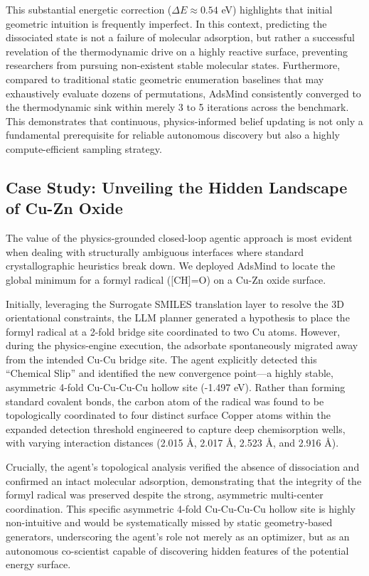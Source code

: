 \documentclass{article}
\begin{document}
This substantial energetic correction ($\Delta E \approx 0.54$ eV) highlights that initial geometric intuition is frequently imperfect. In this context, predicting the dissociated state is not a failure of molecular adsorption, but rather a successful revelation of the thermodynamic drive on a highly reactive surface, preventing researchers from pursuing non-existent stable molecular states. Furthermore, compared to traditional static geometric enumeration baselines that may exhaustively evaluate dozens of permutations, AdsMind consistently converged to the thermodynamic sink within merely 3 to 5 iterations across the benchmark. This demonstrates that continuous, physics-informed belief updating is not only a fundamental prerequisite for reliable autonomous discovery but also a highly compute-efficient sampling strategy.

\subsection{Case Study: Unveiling the Hidden Landscape of Cu-Zn Oxide}
The value of the physics-grounded closed-loop agentic approach is most evident when dealing with structurally ambiguous interfaces where standard crystallographic heuristics break down. We deployed AdsMind to locate the global minimum for a formyl radical ($\text{[CH]=O}$) on a Cu-Zn oxide surface.

Initially, leveraging the Surrogate SMILES translation layer to resolve the 3D orientational constraints, the LLM planner generated a hypothesis to place the formyl radical at a 2-fold bridge site coordinated to two Cu atoms. However, during the physics-engine execution, the adsorbate spontaneously migrated away from the intended Cu-Cu bridge site. The agent explicitly detected this ``Chemical Slip'' and identified the new convergence point---a highly stable, asymmetric 4-fold Cu-Cu-Cu-Cu hollow site (-1.497 eV). Rather than forming standard covalent bonds, the carbon atom of the radical was found to be topologically coordinated to four distinct surface Copper atoms within the expanded detection threshold engineered to capture deep chemisorption wells, with varying interaction distances (2.015 \AA{}, 2.017 \AA{}, 2.523 \AA{}, and 2.916 \AA{}).

Crucially, the agent's topological analysis verified the absence of dissociation and confirmed an intact molecular adsorption, demonstrating that the integrity of the formyl radical was preserved despite the strong, asymmetric multi-center coordination. This specific asymmetric 4-fold Cu-Cu-Cu-Cu hollow site is highly non-intuitive and would be systematically missed by static geometry-based generators, underscoring the agent's role not merely as an optimizer, but as an autonomous co-scientist capable of discovering hidden features of the potential energy surface.
\end{document}
